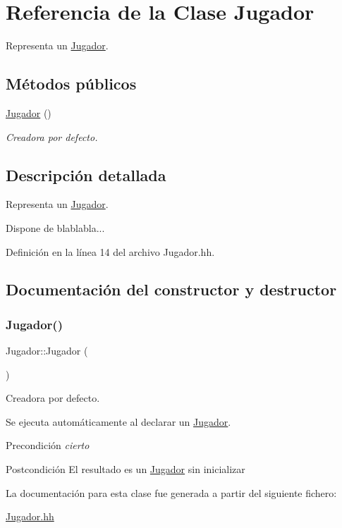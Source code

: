 \hypertarget{class_jugador}{}\section{Referencia de la Clase Jugador}
\label{class_jugador}


Representa un \mbox{\hyperlink{class_jugador}{Jugador}}.  


\subsection*{Métodos públicos}
\begin{DoxyCompactItemize}
\item 
\mbox{\hyperlink{class_jugador_a232c46f75691af6210096e5972535d71}{Jugador}} ()
\begin{DoxyCompactList}\small\item\em Creadora por defecto. \end{DoxyCompactList}\end{DoxyCompactItemize}


\subsection{Descripción detallada}
Representa un \mbox{\hyperlink{class_jugador}{Jugador}}. 

Dispone de blablabla... 

Definición en la línea 14 del archivo Jugador.\+hh.



\subsection{Documentación del constructor y destructor}
\mbox{\label{class_jugador_a232c46f75691af6210096e5972535d71}} 
\subsubsection{\texorpdfstring{Jugador()}{Jugador()}}
{\footnotesize\ttfamily Jugador\+::\+Jugador (\begin{DoxyParamCaption}{ }\end{DoxyParamCaption})}



Creadora por defecto. 

Se ejecuta automáticamente al declarar un \mbox{\hyperlink{class_jugador}{Jugador}}. \begin{DoxyPrecond}{Precondición}
{\itshape cierto} 
\end{DoxyPrecond}
\begin{DoxyPostcond}{Postcondición}
El resultado es un \mbox{\hyperlink{class_jugador}{Jugador}} sin inicializar 
\end{DoxyPostcond}


La documentación para esta clase fue generada a partir del siguiente fichero\+:\begin{DoxyCompactItemize}
\item 
\mbox{\hyperlink{_jugador_8hh}{Jugador.\+hh}}\end{DoxyCompactItemize}
